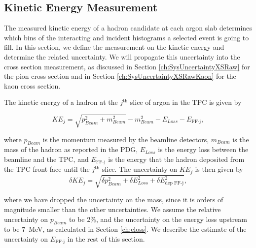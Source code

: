 





\subsection{Kinetic Energy Measurement}\label{ch:kinEn}
The measured kinetic energy of a hadron candidate at each argon slab determines which bins of the interacting and incident histograms a selected event is going to fill. In this section, we define the measurement on the kinetic energy and  determine the related uncertainty. We will propagate this uncertainty into the cross section measurement, as discussed in Section \ref{ch:SysUncertaintyXSRaw} for the pion cross section and in Section \ref{ch:SysUncertaintyXSRawKaon} for the kaon cross section.

The kinetic energy of a hadron at the $j^{\text{th}}$ slice of argon in the TPC is given by

\begin{equation}
KE_{j} = \sqrt{p_{Beam}^2 + m_{Beam}^2} - m_{Beam}^2 - E_{Loss} - E_{\text{FF-j}},
\end{equation}

where $p_{Beam}$ is the momentum measured by the beamline detectors,  $m_{Beam}$ is the mass of the hadron as reported in the PDG,  $E_{Loss}$  is the energy loss between the beamline and the TPC, and $ E_{\text{FF-j}}$ is the energy that the hadron deposited from the TPC front face until the $j^{\text{th}}$ slice.
The uncertainty on $KE_{j}$ is then given by 
\begin{equation}
\delta KE_{j} = \sqrt{\delta p_{Beam}^2 + \delta E_{Loss}^2 +  \delta  E_{\text{dep FF-j}}^2},
\end{equation}

where we have dropped the uncertainty on the mass, since it is orders of magnitude smaller than the other uncertainties.
We assume the relative uncertainty on $p_{Beam}$ to be 2\%, and the uncertainty on the energy loss upstream to be 7~MeV, as calculated in Section \ref{ch:eloss}. We describe the estimate of the uncertainty on $E_{\text{FF-j}}$ in the rest of this section.

